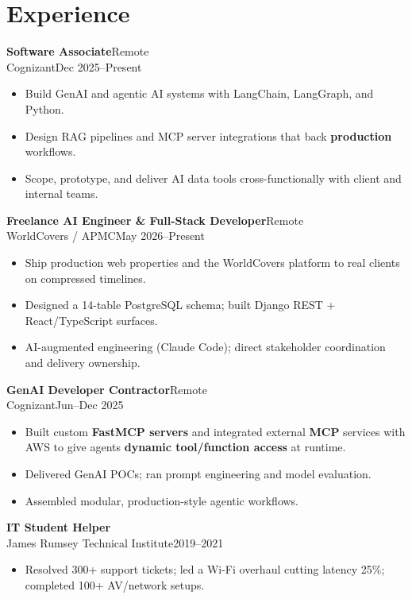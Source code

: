 \documentclass[10pt]{article}
\newcommand{\dentry}[4]{\noindent\textbf{#1}\hfill{#2}\\{#3}\hfill{#4}\par}
\begin{document}
\section*{Experience}
\dentry{Software Associate}{Remote}{Cognizant}{Dec 2025–Present}
\begin{itemize}
  \item Build GenAI and agentic AI systems with LangChain, LangGraph, and Python.
  \item Design RAG pipelines and MCP server integrations that back \textbf{production} workflows.
  \item Scope, prototype, and deliver AI data tools cross-functionally with client and internal teams.
\end{itemize}
\dentry{Freelance AI Engineer \& Full-Stack Developer}{Remote}{WorldCovers / APMC}{May 2026–Present}
\begin{itemize}
  \item Ship production web properties and the WorldCovers platform to real clients on compressed timelines.
  \item Designed a 14-table PostgreSQL schema; built Django REST + React/TypeScript surfaces.
  \item AI-augmented engineering (Claude Code); direct stakeholder coordination and delivery ownership.
\end{itemize}
\dentry{GenAI Developer Contractor}{Remote}{Cognizant}{Jun–Dec 2025}
\begin{itemize}
  \item Built custom \textbf{FastMCP servers} and integrated external \textbf{MCP} services with AWS to give agents \textbf{dynamic tool/function access} at runtime.
  \item Delivered GenAI POCs; ran prompt engineering and model evaluation.
  \item Assembled modular, production-style agentic workflows.
\end{itemize}
\dentry{IT Student Helper}{}{James Rumsey Technical Institute}{2019–2021}
\begin{itemize}
  \item Resolved 300+ support tickets; led a Wi-Fi overhaul cutting latency 25\%; completed 100+ AV/network setups.
\end{itemize}
\end{document}
